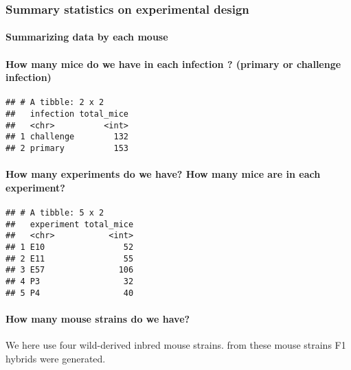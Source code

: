 \documentclass[
]{article}
\begin{document}
\hypertarget{summary-statistics-on-experimental-design}{%
\subsubsection{Summary statistics on experimental
design}\label{summary-statistics-on-experimental-design}}

\hypertarget{summarizing-data-by-each-mouse}{%
\paragraph{Summarizing data by each
mouse}\label{summarizing-data-by-each-mouse}}

\hypertarget{how-many-mice-do-we-have-in-each-infection-primary-or-challenge-infection}{%
\paragraph{How many mice do we have in each infection ? (primary or
challenge
infection)}\label{how-many-mice-do-we-have-in-each-infection-primary-or-challenge-infection}}

\begin{verbatim}
## # A tibble: 2 x 2
##   infection total_mice
##   <chr>          <int>
## 1 challenge        132
## 2 primary          153
\end{verbatim}

\hypertarget{how-many-experiments-do-we-have-how-many-mice-are-in-each-experiment}{%
\paragraph{How many experiments do we have? How many mice are in each
experiment?}\label{how-many-experiments-do-we-have-how-many-mice-are-in-each-experiment}}

\begin{verbatim}
## # A tibble: 5 x 2
##   experiment total_mice
##   <chr>           <int>
## 1 E10                52
## 2 E11                55
## 3 E57               106
## 4 P3                 32
## 5 P4                 40
\end{verbatim}

\hypertarget{how-many-mouse-strains-do-we-have}{%
\paragraph{How many mouse strains do we
have?}\label{how-many-mouse-strains-do-we-have}}

We here use four wild-derived inbred mouse strains. from these mouse
strains F1 hybrids were generated.
\end{document}
